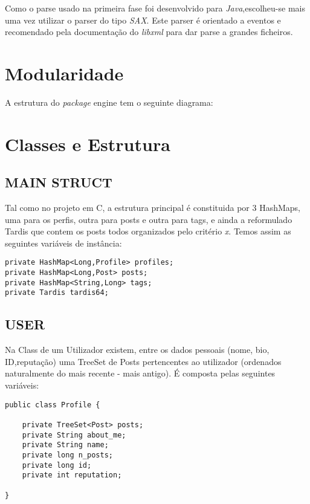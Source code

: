 \documentclass[letterpaper, 10 pt, conference]{IEEEtran}  %
\begin{document}
Como o parse usado na primeira fase foi desenvolvido para \textit{Java},escolheu-se mais uma vez utilizar o parser do tipo \textit{SAX}. Este parser é orientado a eventos e recomendado pela documentação do \textit{libxml} para dar parse a grandes ficheiros.


\section{Modularidade}
A estrutura do \textit{package} engine tem o seguinte diagrama:




\section{Classes e Estrutura}

\subsection{MAIN STRUCT}
Tal como no projeto em C, a estrutura principal é constituida por 3 HashMaps, uma para os perfis, outra para posts e outra para tags, e ainda a reformulado Tardis que contem os posts todos organizados pelo critério \textit{x}.
\newline
Temos assim as seguintes variáveis de instância:
\begin{lstlisting}
private HashMap<Long,Profile> profiles;
private HashMap<Long,Post> posts;
private HashMap<String,Long> tags;
private Tardis tardis64;
\end{lstlisting}

\subsection{USER}

Na Class de um Utilizador existem, entre os dados pessoais (nome, bio, ID,reputação) uma TreeSet de Posts
pertencentes ao utilizador (ordenados naturalmente do mais recente - mais antigo).
É composta pelas seguintes variáveis:

\begin{lstlisting}
public class Profile {

    private TreeSet<Post> posts;
    private String about_me;
    private String name;
    private long n_posts;
    private long id;
    private int reputation;

}
\end{lstlisting}
\end{document}
